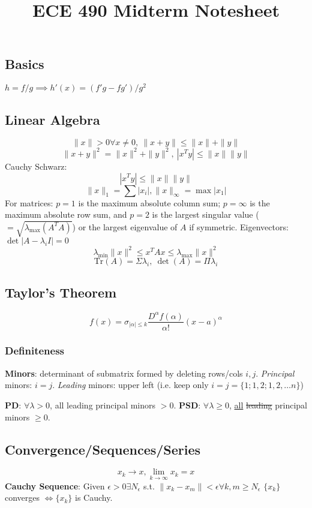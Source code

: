 \documentclass[10pt,landscape]{article}
\title{ECE 490 Midterm Notesheet}
\begin{document}


\begin{multicols*}{\mycolnums}
    \section*{Basics}
    $h=f/g\implies h'(x)=(f'g-fg')/g^2$
    \subsection*{Linear Algebra}
    \[\|x\|>0\forall x\neq0,\ \|x+y\|\leq\|x\|+\|y\|\]
    \[\|x+y\|^2=\|x\|^2+\|y\|^2,\ |x^Ty|\leq\|x\|\|y\|\]
    Cauchy Schwarz:
    \[|x^Ty|\leq\|x\|\|y\|\]
    \[\|x\|_1=\sum|x_i|, \|x\|_\infty=\max|x_1|\]
    For matrices: $p=1$ is the maximum absolute column sum; $p=\infty$ is the
    maximum absolute row sum, and $p=2$ is the largest singular value ($=\sqrt{\lambda_{\max}(A^TA)}$)
    or the largest eigenvalue of $A$ if symmetric.
    Eigenvectors: $\det|A-\lambda_iI| = 0$
    \[\lambda_{\min}\|x\|^2 \leq x^TAx\leq \lambda_{\max}\|x\|^2\]
    \[\mathrm{Tr}(A)=\Sigma\lambda_i,\ \det(A)=\Pi\lambda_i\]
    \subsection*{Taylor's Theorem}
    \[f(x) = \sigma_{|\alpha|\leq k}\frac{D^\alpha f(\alpha)}{\alpha!}(x-a)^\alpha\]
    \subsubsection*{Definiteness}
    \textbf{Minors}: determinant of submatrix formed by deleting rows/cols $i,j$. \textit{Principal}
    minors: $i=j$. \textit{Leading} minors: upper left (i.e. keep only $i=j=\{1;1,2;1,2,\ldots n\}$)

    \noindent
    \textbf{PD}: $\forall\lambda>0$, all leading principal minors $>0$.
    \noindent
    \textbf{PSD}: $\forall\lambda\geq0$, \uline{all} \sout{leading} principal minors $\geq0$.
    \subsection*{Convergence/Sequences/Series}
    \[x_k\rightarrow x,\lim_{k\rightarrow\infty}x_k=x\]
    \textbf{Cauchy Sequence}: Given $\epsilon>0\exists N_{\epsilon}$ s.t. $\|x_k-x_m\|<\epsilon\forall k,m\geq N_\epsilon$
    $\{x_k\}$ converges $\iff \{x_k\}$ is Cauchy.


\end{multicols*}
\end{document}
